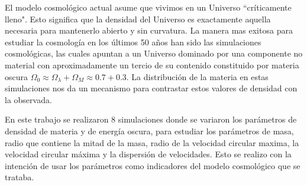 
El modelo cosmológico actual asume que vivimos en un Universo ``críticamente lleno". Esto significa que la densidad  del Universo es exactamente aquella necesaria para mantenerlo abierto y sin curvatura. La manera mas exitosa para estudiar la cosmología en los últimos 50 años han sido las simulaciones cosmológicas, las cuales apuntan a un Universo dominado por una componente no material con aproximadamente un tercio de su contenido constituido por materia oscura $\Omega_0 \approx \Omega_\lambda + \Omega_M \approx 0.7+ 0.3$. La distribución de la materia en estas simulaciones nos da un mecanismo para contrastar estos valores de densidad con la observada.


 En este trabajo se realizaron 8 simulaciones donde se variaron los parámetros de densidad de materia y de energía oscura, para estudiar los parámetros de masa, radio que contiene la mitad de la masa, radio de la velocidad circular maxima, la velocidad circular máxima y la dispersión de velocidades. Esto se realizo con la intención de usar los parámetros como indicadores del modelo cosmológico que se trataba.














